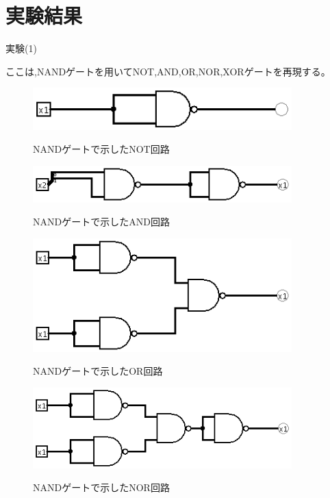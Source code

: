 \documentclass[a4paper,11pt,titlepage]{jarticle}
\begin{document}
\section{実験結果}
実験(1)\par
ここは,NANDゲートを用いてNOT,AND,OR,NOR,XORゲートを再現する。\par
\begin{figure}[htbp]
  \centering
  \includegraphics[width=100mm]{sample4.png}
  \label{sample1}\\
  \caption{NANDゲートで示したNOT回路}
\end{figure}
\par
\begin{figure}[htbp]
  \centering
  \includegraphics[width=100mm]{sample5.png}
  \label{sample2}\\
  \caption{NANDゲートで示したAND回路}
\end{figure}
\par
\begin{figure}[htbp]
  \centering
  \includegraphics[width=100mm]{sample6.png}
  \label{sample3}\\
  \caption{NANDゲートで示したOR回路}
\end{figure}
\par
\begin{figure}[htbp]
  \centering
  \includegraphics[width=100mm]{sample7.png}
  \label{sample4}\\
  \caption{NANDゲートで示したNOR回路}
\end{figure}
\end{document}
